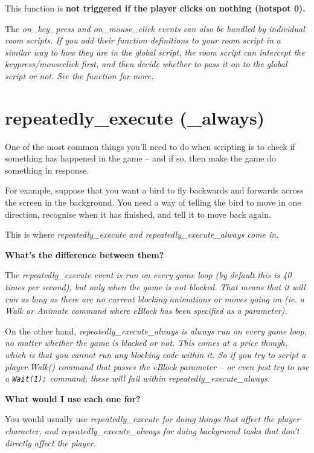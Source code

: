 \begin{itemize}
  This function is \bf{not} triggered if the player clicks on nothing (hotspot 0).
\end{itemize}

The \it{on_key_press} and \it{on_mouse_click} events can also be handled by
individual room scripts. If you add their function definitions to your room script
in a similar way to how they are in the global script, the room script can intercept
the keypress/mouseclick first, and then decide whether to pass it on to the global
script or not. See the  function for more.


\section{repeatedly_execute (_always)}\label{RepExec}%

One of the most common things you'll need to do when scripting is to check if something
has happened in the game -- and if so, then make the game do something in response.

For example, suppose that you want a bird to fly backwards and forwards across the screen
in the background. You need a way of telling the bird to move in one direction, recognise
when it has finished, and tell it to move back again.

This is where \it{repeatedly_execute} and \it{repeatedly_execute_always} come in.

\bf{What's the difference between them?}

The \it{repeatedly_execute} event is run on every game loop (by default this is 40 times per
second), but only when the game is not blocked. That means that it will run as long as there
are no current blocking animations or moves going on (ie. a Walk or Animate command where
\it{eBlock} has been specified as a parameter).

On the other hand, \it{repeatedly_execute_always} is always run on every game loop, no matter
whether the game is blocked or not. This comes at a price though, which is that you cannot
run any blocking code within it. So if you try to script a \it{player.Walk()} command that
passes the \it{eBlock} parameter -- or even just try to use a \verb$Wait(1);$ command, these
will fail within \it{repeatedly_execute_always}.

\bf{What would I use each one for?}

You would usually use \it{repeatedly_execute} for doing things that affect the player character,
and \it{repeatedly_execute_always} for doing background tasks that don't directly affect the
player.

